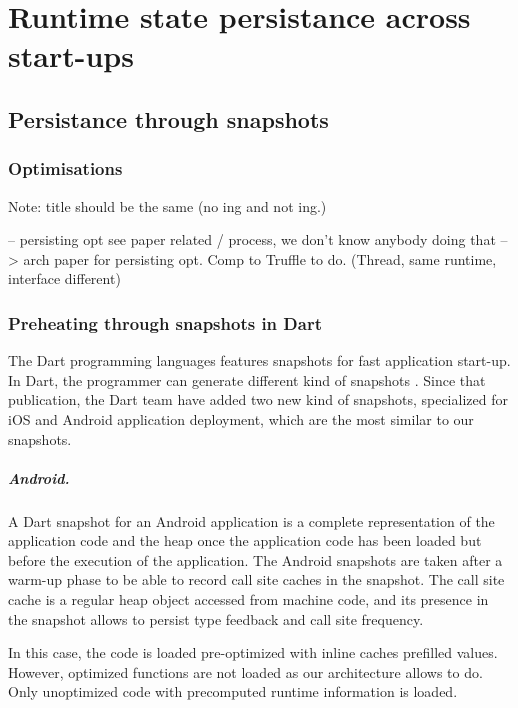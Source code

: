 \documentclass[a4paper,12pt,twoside]{../includes/ThesisStyle}
\begin{document}
\fi

\chapter{Runtime state persistance across start-ups}
\label{chap:persistance}
\minitoc


\section{Persistance through snapshots}

\subsection{Optimisations}
Note: title should be the same (no ing and not ing.)

-- persisting opt see paper related / process, we don't know anybody doing that
--> arch paper for persisting opt. Comp to Truffle to do. (Thread, same runtime, interface different)

\subsection{Preheating through snapshots in Dart}

The Dart programming languages features snapshots for fast application start-up. In Dart, the programmer can generate different kind of snapshots \cite{Anna13a}. Since that publication, the Dart team have added two new kind of snapshots, specialized for iOS and Android application deployment, which are the most similar to our snapshots.

\paragraph{Android.} A Dart snapshot for an Android application is a complete representation of the application code and the heap once the application code has been loaded but before the execution of the application. The Android snapshots are taken after a warm-up phase to be able to record call site caches in the snapshot. The call site cache is a regular heap object accessed from machine code, and its presence in the snapshot allows to persist type feedback and call site frequency.

In this case, the code is loaded pre-optimized with inline caches prefilled values. However, optimized functions are not loaded as our architecture allows to do. Only unoptimized code with precomputed runtime information is loaded.
\end{document}
